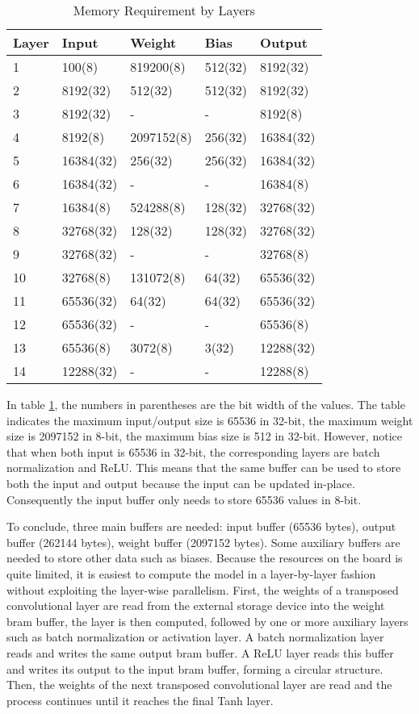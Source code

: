 \begin{table}[h]
  \centering
  \caption{Memory Requirement by Layers}
  \begin{tabular}{l | l | l | l | l}
    \toprule
    Layer & Input & Weight & Bias & Output \\
    \midrule
    1 & 100(8) & 819200(8) & 512(32) & 8192(32) \\
    2 & 8192(32) & 512(32) & 512(32) & 8192(32) \\
    3 & 8192(32) & - & - & 8192(8) \\
    4 & 8192(8) & 2097152(8) & 256(32) & 16384(32) \\
    5 & 16384(32) & 256(32) & 256(32) & 16384(32) \\
    6 & 16384(32) & - & - & 16384(8) \\
    7 & 16384(8) & 524288(8) & 128(32) & 32768(32) \\
    8 & 32768(32) & 128(32) & 128(32) & 32768(32) \\
    9 & 32768(32) & - & - & 32768(8) \\
    10 & 32768(8) & 131072(8) & 64(32) & 65536(32) \\
    11 & 65536(32) & 64(32) & 64(32) & 65536(32) \\
    12 & 65536(32) & - & - & 65536(8) \\
    13 & 65536(8) & 3072(8) & 3(32) & 12288(32) \\
    14 & 12288(32) & - & - & 12288(8) \\
    \bottomrule
  \end{tabular}
  \label{table:memory_requirements}
\end{table}

In table \ref{table:memory_requirements}, the numbers in parentheses are the bit width of the values. The table
indicates the maximum input/output size is 65536 in 32-bit, the maximum weight size is 2097152 in 8-bit, the
maximum bias size is 512 in 32-bit. However, notice that when both input is 65536 in 32-bit, the corresponding
layers are batch normalization and ReLU. This means that the same buffer can be used to store both the
input and output because the input can be updated in-place. Consequently the input buffer only needs to
store 65536 values in 8-bit.

To conclude, three main buffers are needed: input buffer (65536 bytes), output buffer (262144 bytes),
weight buffer (2097152 bytes). Some auxiliary buffers are needed to store other data such as biases.
Because the resources on the board is quite limited, it is easiest to compute the model in a layer-by-layer
fashion without exploiting the layer-wise parallelism. First, the weights of a transposed
convolutional layer are read from the external storage device into the weight \gls{bram} buffer,
the layer is then computed, followed by one or
more auxiliary layers such as batch normalization or activation layer. A batch normalization layer
reads and writes the same output \gls{bram} buffer. A ReLU layer reads this buffer and writes its output to
the input \gls{bram} buffer, forming a circular structure. Then, the weights of the next transposed
convolutional layer are read and the process continues until it reaches the final Tanh layer.


